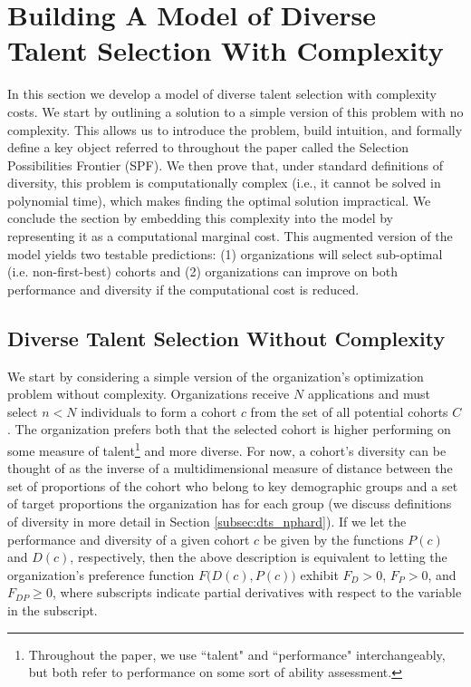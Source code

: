 \section{Building A Model of Diverse Talent Selection With Complexity}\label{sec:model}

In this section we develop a model of diverse talent selection with complexity costs. We start by outlining a solution to a simple version of this problem with no complexity. This allows us to introduce the problem, build intuition, and formally define a key object referred to throughout the paper called the Selection Possibilities Frontier (SPF). We then prove that, under standard definitions of diversity, this problem is computationally complex (i.e., it cannot be solved in polynomial time), which makes finding the optimal solution impractical. We conclude the section by embedding this complexity into the model by representing it as a computational marginal cost. This augmented version of the model yields two testable predictions: (1) organizations will select sub-optimal (i.e. non-first-best) cohorts and (2) organizations can improve on both performance and diversity if the computational cost is reduced. 

\subsection{Diverse Talent Selection Without Complexity}\label{subsec:simple_model}

We start by considering a simple version of the organization's optimization problem without complexity. Organizations receive $N$ applications and must select $n<N$ individuals to form a cohort $c$ from the set of all potential cohorts $C$. The organization prefers both that the selected cohort is higher performing on some measure of talent\footnote{Throughout the paper, we use ``talent" and ``performance" interchangeably, but both refer to performance on some sort of ability assessment.} and more diverse. For now, a cohort's diversity can be thought of as the inverse of a multidimensional measure of distance between the set of proportions of the cohort who belong to key demographic groups and a set of target proportions the organization has for each group (we discuss definitions of diversity in more detail in Section \ref{subsec:dts_nphard}). If we let the performance and diversity of a given cohort $c$ be given by the functions $P(c)$ and $D(c)$, respectively, then the above description is equivalent to letting the organization's preference function $F\Big(D(c),P(c)\Big)$ exhibit $F_D>0$, $F_P>0$, and $F_{DP}\geq0$, where subscripts indicate partial derivatives with respect to the variable in the subscript. 

